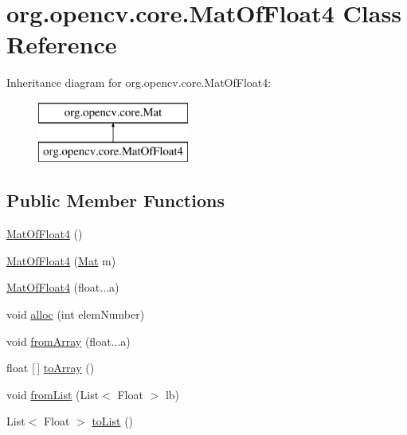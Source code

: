\hypertarget{classorg_1_1opencv_1_1core_1_1_mat_of_float4}{}\section{org.\+opencv.\+core.\+Mat\+Of\+Float4 Class Reference}
\label{classorg_1_1opencv_1_1core_1_1_mat_of_float4}
Inheritance diagram for org.\+opencv.\+core.\+Mat\+Of\+Float4\+:\begin{figure}[H]
\begin{center}
\leavevmode
\includegraphics[height=2.000000cm]{classorg_1_1opencv_1_1core_1_1_mat_of_float4}
\end{center}
\end{figure}
\subsection*{Public Member Functions}
\begin{DoxyCompactItemize}
\item 
\mbox{\hyperlink{classorg_1_1opencv_1_1core_1_1_mat_of_float4_a5ddf6bc24d5fbbe1677edf37cc1c37f7}{Mat\+Of\+Float4}} ()
\item 
\mbox{\hyperlink{classorg_1_1opencv_1_1core_1_1_mat_of_float4_ad83f32f3c03332db99ea54634e47ae1b}{Mat\+Of\+Float4}} (\mbox{\hyperlink{classorg_1_1opencv_1_1core_1_1_mat}{Mat}} m)
\item 
\mbox{\hyperlink{classorg_1_1opencv_1_1core_1_1_mat_of_float4_a453f3f332d3dddde491c14da0e93cc1a}{Mat\+Of\+Float4}} (float...\+a)
\item 
void \mbox{\hyperlink{classorg_1_1opencv_1_1core_1_1_mat_of_float4_adec4990c19609d530a237d6f83308e39}{alloc}} (int elem\+Number)
\item 
void \mbox{\hyperlink{classorg_1_1opencv_1_1core_1_1_mat_of_float4_afbd729497c213abffd697ca51da6e408}{from\+Array}} (float...\+a)
\item 
float \mbox{[}$\,$\mbox{]} \mbox{\hyperlink{classorg_1_1opencv_1_1core_1_1_mat_of_float4_a710245df3ca2d3e9917588bdcde5df02}{to\+Array}} ()
\item 
void \mbox{\hyperlink{classorg_1_1opencv_1_1core_1_1_mat_of_float4_a7a4a2f7e4b2058465372fd9ae327624b}{from\+List}} (List$<$ Float $>$ lb)
\item 
List$<$ Float $>$ \mbox{\hyperlink{classorg_1_1opencv_1_1core_1_1_mat_of_float4_acaf8ab6260da5c65910b4e2b8a0f3e69}{to\+List}} ()
\end{DoxyCompactItemize}
